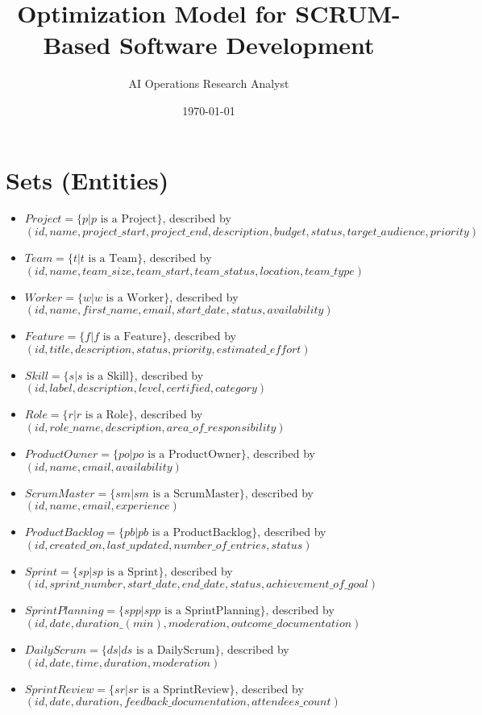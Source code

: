 \documentclass[11pt]{article}
\title{Optimization Model for SCRUM-Based Software Development}
\author{AI Operations Research Analyst}
\date{\today}
\begin{document}
\maketitle
\tableofcontents
\newpage

\section{Sets (Entities)}
\begin{itemize}
    \item $Project = \{p | p \text{ is a Project}\}$, described by $(id, name, project\_start, project\_end, description, budget, status, target\_audience, priority)$
    \item $Team = \{t | t \text{ is a Team}\}$, described by $(id, name, team\_size, team\_start, team\_status, location, team\_type)$
    \item $Worker = \{w | w \text{ is a Worker}\}$, described by $(id, name, first\_name, email, start\_date, status, availability)$
    \item $Feature = \{f | f \text{ is a Feature}\}$, described by $(id, title, description, status, priority, estimated\_effort)$
    \item $Skill = \{s | s \text{ is a Skill}\}$, described by $(id, label, description, level, certified, category)$
    \item $Role = \{r | r \text{ is a Role}\}$, described by $(id, role\_name, description, area\_of\_responsibility)$
    \item $ProductOwner = \{po | po \text{ is a ProductOwner}\}$, described by $(id, name, email, availability)$
    \item $ScrumMaster = \{sm | sm \text{ is a ScrumMaster}\}$, described by $(id, name, email, experience)$
    \item $ProductBacklog = \{pb | pb \text{ is a ProductBacklog}\}$, described by $(id, created\_on, last\_updated, number\_of\_entries, status)$
    \item $Sprint = \{sp | sp \text{ is a Sprint}\}$, described by $(id, sprint\_number, start\_date, end\_date, status, achievement\_of\_goal)$
    \item $SprintPlanning = \{spp | spp \text{ is a SprintPlanning}\}$, described by $(id, date, duration\_(min), moderation, outcome\_documentation)$
    \item $DailyScrum = \{ds | ds \text{ is a DailyScrum}\}$, described by $(id, date, time, duration, moderation)$
    \item $SprintReview = \{sr | sr \text{ is a SprintReview}\}$, described by $(id, date, duration, feedback\_documentation, attendees\_count)$

\end{itemize}
\end{document}
